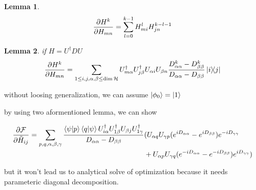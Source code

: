 \documentclass{article}
\begin{document}
\newtheorem{lemma}{Lemma}
\begin{lemma}
\[ \pdv{H^k}{H_{mn}} = \sum_{l = 0}^{k-1} H^{l}_{mi} H^{k-l-1}_{jn} \]
\end{lemma}

\begin{lemma}
if
$H = U^\dagger D U$
\[ \pdv{H^k}{H_{mn}} = \sum_{1 \le i, j, \alpha,\beta \le \dim{\mathcal{H}}} U_{m\alpha}^\dagger U_{j\beta}^\dagger U_{\alpha i} U_{\beta n} \frac{D_{\alpha\alpha}^k - D_{\beta\beta}^k}{D_{\alpha\alpha} - D_{\beta\beta}} \dyad{i}{j} \] 
\end{lemma}

without loosing generalization, we can assume $\ket{\phi_0} = \ket{1}$

by using two aformentioned lemma, we can show

\[ \begin{split} 
  \pdv{\mathcal{F}}{\tilde{H}_{ij}} = \sum_{p,q,\alpha,\beta,\gamma} \frac{\braket{\psi}{p}\braket{q}{\psi}U^\dagger_{i \alpha} U^\dagger_{1 \beta} U_{\beta j} U^\dagger_{1 \gamma}}{D_{\alpha\alpha} - D_{\beta\beta}} & ( U_{\alpha q} U_{\gamma p}(e^{iD_{\alpha\alpha}} - e^{iD_{\beta\beta}}) e^{-iD_{\gamma\gamma}} \\
   & + U_{\alpha p} U_{\gamma q} (e^{-iD_{\alpha\alpha}} - e^{-iD_{\beta\beta}}) e^{iD_{\gamma\gamma}} )
 \end{split} \]
 
 but it won't lead us to analytical solve of optimization because it needs parameteric diagonal decomposition.
\end{document}
